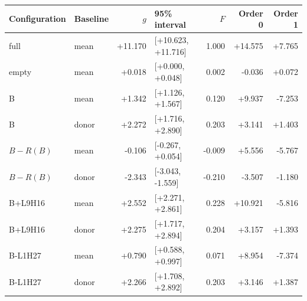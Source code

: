 \begin{tabular}{@{}llrlrrr@{}}
\toprule
Configuration & Baseline & $g$ & 95\% interval & $F$ & Order 0 & Order 1 \\
\midrule
full & mean & +11.170 & [+10.623, +11.716] & 1.000 & +14.575 & +7.765 \\
empty & mean & +0.018 & [+0.000, +0.048] & 0.002 & -0.036 & +0.072 \\
B & mean & +1.342 & [+1.126, +1.567] & 0.120 & +9.937 & -7.253 \\
B & donor & +2.272 & [+1.716, +2.890] & 0.203 & +3.141 & +1.403 \\
$B-R(B)$ & mean & -0.106 & [-0.267, +0.054] & -0.009 & +5.556 & -5.767 \\
$B-R(B)$ & donor & -2.343 & [-3.043, -1.559] & -0.210 & -3.507 & -1.180 \\
B+L9H16 & mean & +2.552 & [+2.271, +2.861] & 0.228 & +10.921 & -5.816 \\
B+L9H16 & donor & +2.275 & [+1.717, +2.894] & 0.204 & +3.157 & +1.393 \\
B-L1H27 & mean & +0.790 & [+0.588, +0.997] & 0.071 & +8.954 & -7.374 \\
B-L1H27 & donor & +2.266 & [+1.708, +2.892] & 0.203 & +3.146 & +1.387 \\
\bottomrule
\end{tabular}
